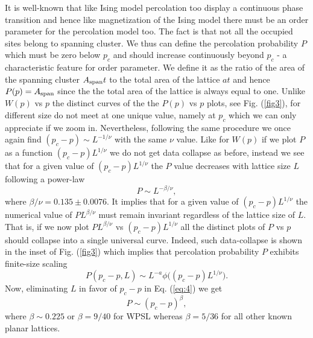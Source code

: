 ﻿\documentclass[twocolumn,showpacs,preprintnumbers,amsmath,amssymb]{revtex4}
\begin{document}
It is well-known that like Ising model percolation too display a continuous phase
transition and hence like magnetization of the Ising model there must be an order parameter for the percolation
model too. The fact is that not all the occupied sites 
belong to spanning cluster. We thus can define the percolation probability $P$ which must be zero 
below $p_c$ and should increase continuously beyond $p_c$ - a characteristic feature for order parameter.  
We define it as the ratio of the area of the spanning cluster
$A_{{\rm span}}t$ to the total area of the lattice $at$ and hence
$P(p)= A_{{\rm span}}$
since the the total area of the lattice is always equal to one. 
Unlike $W(p)$ vs $p$ the distinct curves of the the $P(p)$ vs $p$ plots, see Fig. (\ref{fig3}), for different size do not meet at one unique value,
namely at $p_c$ which we can only appreciate if we zoom in. Nevertheless,
following the same procedure we once again
find  $(p_c-p)\sim L^{-1/\nu}$ with the same $\nu$ value. Like for $W(p)$ if we plot $P$ as a function $(p_c-p)L^{1/\nu}$
we do not get data collapse as before, instead we see that for a given value of $(p_c-p)L^{1/\nu}$ the $P$ value 
decreases with lattice size $L$ following a power-law 
\begin{equation}
\label{eq:4}
P\sim L^{-\beta/\nu},
\end{equation}
where $\beta/\nu=0.135\pm 0.0076$. It implies that for a given value of $(p_c-p)L^{1/\nu}$ the numerical value of $PL^{\beta/\nu}$ must remain invariant regardless of the lattice size of $L$. That is, 
if we now plot $PL^{\beta/\nu}$ vs $(p_c-p)L^{1/\nu}$ all the distinct plots of $P$ vs $p$ should collapse into a single universal
curve. Indeed, such data-collapse is shown in the inset of Fig. (\ref{fig3}) which implies that percolation probability $P$
exhibits finite-size scaling
\begin{equation}
P(p_c-p,L)\sim L^{-a}\phi\Big ((p_c-p)L^{1/\nu}\Big ).
\end{equation}
Now, eliminating $L$ in favor of $p_c-p$ in Eq. (\ref{eq:4}) we get
\begin{equation}
\label{eq:5}
P\sim (p_c-p)^\beta,
\end{equation}
where $\beta\sim 0.225$ or $\beta=9/40$ for WPSL whereas $\beta=5/36$ for all other known planar lattices. 



\end{document}
